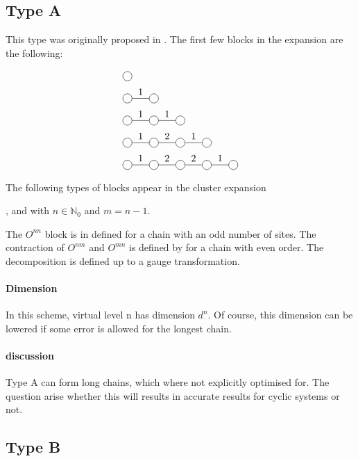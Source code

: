 
\subsection{Type A}
This type was originally proposed in \cite{Vanhecke2021}. The first few blocks in the expansion are the following:

\begin{equation}
    \begin{split}
        &\mpob{1}{ {,}  }{}{}{}{{,,}} \\
        &\mpob{2}{ {,"1",}  }{}{}{}{{,,}}\\
        &\mpob{3}{ {,"1","1",}  }{}{}{}{{,,,}}\\
        &\mpob{4}{ {,"1","2","1",}  }{}{}{}{{,,,,,}}\\
        &\mpob{5}{ {,"1","2","2","1",}  }{}{}{}{{,,,,,}}\\
    \end{split}
\end{equation}

The following types of blocks appear in the cluster expansion

, and  with $n \in \mathbb{N}_0$ and $m=n-1$.

The $O^{n n}$ block is in defined for a chain with an odd number of sites. The contraction of $O^{n m }$ and $O^{m n} $ is defined by for a chain with even order. The decomposition is defined up to a gauge transformation.

\paragraph{Dimension}

In this scheme, virtual level n has dimension $d^n$. Of course, this dimension can be lowered if some error is allowed for the longest chain.

\paragraph{discussion}

Type A can form long chains, which where not explicitly optimised for. The question arise whether this will results in accurate results for cyclic systems or not.

\subsection{Type B}

